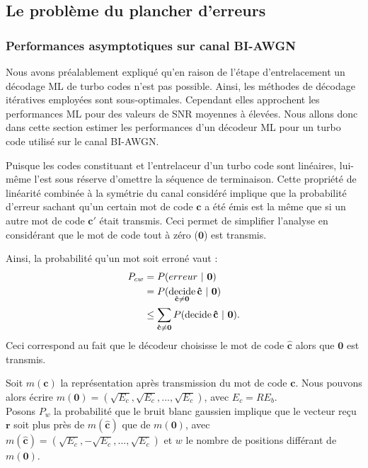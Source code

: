 \subsection{Le problème du plancher d'erreurs}

\subsubsection{Performances asymptotiques sur canal BI-AWGN}
Nous avons préalablement expliqué qu'en raison de l'étape d'entrelacement un décodage ML de turbo codes n'est pas possible. 
Ainsi, les méthodes de décodage itératives employées sont sous-optimales. Cependant elles approchent les performances ML 
pour des valeurs de SNR moyennes à élevées.
Nous allons donc dans cette section estimer les performances d'un décodeur ML pour un turbo code utilisé sur le canal BI-AWGN.

Puisque les codes constituant et l'entrelaceur d'un turbo code sont linéaires, lui-même l'est sous réserve d'omettre la 
séquence de terminaison. Cette propriété de linéarité combinée à la symétrie du canal considéré implique que la probabilité 
d'erreur sachant qu'un certain mot de code $\mathbf{c}$ a été émis est la même que si un autre mot de code $\mathbf{c'}$ 
était transmis. Ceci permet de simplifier l'analyse en considérant que le mot de code tout à zéro ($\mathbf{0}$) est transmis.

Ainsi, la probabilité qu'un mot soit erroné vaut : 
\begin{align}\label{eq:err}
	P_{cw} & = P(erreur~|~\mathbf{0}) \notag                                                             \\
	       & = P( \operatorname*{decide}\limits_{\mathbf{\hat{c}}\neq \mathbf{0}} \mathbf{\hat{c}}~|~\mathbf{0}) \notag \\
	       & \le \sum\limits_{\mathbf{\hat{c}}\neq \mathbf{0}}P( \operatorname*{decide} \mathbf{\hat{c}}~|~\mathbf{0}). 
\end{align}
Ceci correspond au fait que le décodeur choisisse le mot de code $\mathbf{\hat{c}}$ alors que $\mathbf{0}$ est transmis.

Soit $m(\mathbf{c})$ la représentation après transmission du mot de code $\mathbf{c}$. Nous pouvons alors écrire 
$m(\mathbf{0}) = (\sqrt{E_c},\sqrt{E_c},...,\sqrt{E_c})$, avec $E_c = RE_b$.\\
Posons $P_w$ la probabilité que le bruit blanc gaussien implique que le vecteur reçu $\mathbf{r}$ soit plus près de  
$m(\mathbf{\hat{c}})$ que de $m(\mathbf{0})$, avec $m(\mathbf{\hat{c}}) = (\sqrt{E_c},-\sqrt{E_c},...,\sqrt{E_c})$ et 
$w$ le nombre de positions différant de $m(\mathbf{0})$.

